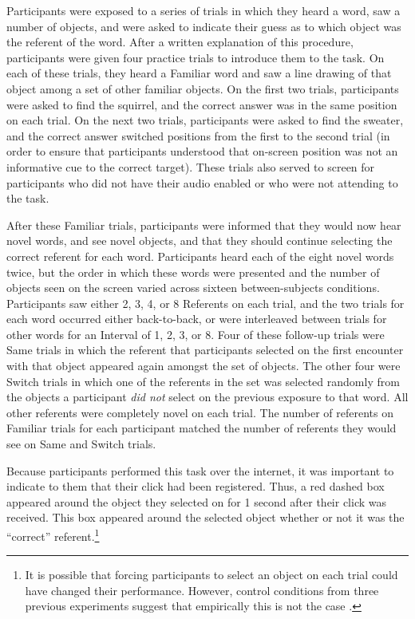 \documentclass[authoryear,review]{elsarticle}
\begin{document}
Participants were exposed to a series of trials in which they heard a word, saw a number of objects, and were asked to indicate their guess as to which object was the referent of the word. After a written explanation of this procedure, participants were given four practice trials to introduce them to the task. On each of these trials, they heard a Familiar word and saw a line drawing of that object among a set of other familiar objects. On the first two trials, participants were asked to find the squirrel, and the correct answer was in the same position on each trial. On the next two trials, participants were asked to find the sweater, and the correct answer switched positions from the first to the second trial (in order to ensure that participants understood that on-screen position was not an informative cue to the correct target). These trials also served to screen for participants who did not have their audio enabled or who were not attending to the task.

After these Familiar trials, participants were informed that they would now hear novel words, and see novel objects, and that they should continue selecting the correct referent for each word. Participants heard each of the eight novel words twice, but the order in which these words were presented and the number of objects seen on the screen varied across sixteen between-subjects conditions. Participants saw either 2, 3, 4, or 8 Referents on each trial, and the two trials for each word occurred either back-to-back, or were interleaved between trials for other words for an Interval of 1, 2, 3, or 8. Four of these follow-up trials were Same trials in which the referent that participants selected on the first encounter with that object appeared again amongst the set of objects. The other four were Switch trials in which one of the referents in the set was selected randomly from the objects a participant \emph{did not} select on the previous exposure to that word. All other referents were completely novel on each trial. The number of referents on Familiar trials for each participant matched the number of referents they would see on Same and Switch trials.

Because participants performed this task over the internet, it was important to indicate to them that their click had been registered. Thus, a red dashed box appeared around the object they selected on for 1 second after their click was received. This box appeared around the selected object whether or not it was the ``correct'' referent.\footnote{It is possible that forcing participants to select an object on each trial could have changed their performance. However, control conditions from three previous experiments suggest that empirically this is not the case \cite{Medina2011, Smith2011a, Trueswell2013}.}
\end{document}
